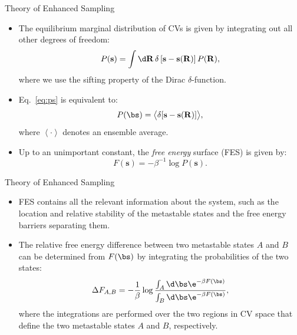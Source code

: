 \documentclass[10pt]{beamer}
\begin{document}
\begin{frame}{Theory of Enhanced Sampling}
\begin{itemize}
\setlength\itemsep{1em}
  \item The equilibrium marginal distribution of CVs is given by integrating out all other degrees of freedom:
  \begin{align}
  \label{eq:ps}
    P(\mathbf{s}) =
      \int \d\mathbf{R} \, \delta
        \left[
          \mathbf{s} - \mathbf{s}(\mathbf{R})
        \right]
      P(\mathbf{R}),
  \end{align}
  where we use the sifting property of the Dirac $\delta$-function.

  \item Eq.~\ref{eq:ps} is equivalent to:
  \begin{equation}
    P(\bs) = \big< \delta[\mathbf{s}-\mathbf{s(R)}] \big>,
  \end{equation}
  where $\left<\cdot\right>$ denotes an ensemble average.

  \item Up to an unimportant constant, the \textit{free energy} surface (FES) is given by:
  \begin{equation}
    F(\mathbf{s})= -\beta^{-1} \log P(\mathbf{s}).
  \end{equation}
\end{itemize}
\end{frame}

\begin{frame}{Theory of Enhanced Sampling}
\begin{itemize}
\setlength\itemsep{1em}
  \item FES contains all the relevant information about the system, such as the location and relative stability of the metastable states and the free energy barriers separating them.

  \item The relative free energy difference between two metastable states $A$ and $B$ can be determined from $F(\bs)$ by integrating the probabilities of the two states:
  \begin{equation}
    \Delta F_{A,B} = -\frac{1}{\beta}\log\frac{\int_A \d\bs\e^{-\beta F(\bs)}}{\int_B \d\bs\e^{-\beta F(\bs)}},
  \end{equation}
  where the integrations are performed over the two regions in CV space that define the two metastable states $A$ and $B$, respectively.
\end{itemize}
\end{frame}
\end{document}
